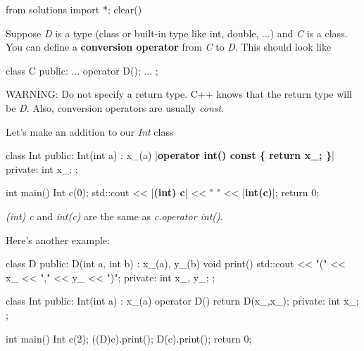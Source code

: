 \begin{python0}
from solutions import *; clear()
\end{python0}

Suppose \textit{D} is a type (class or built-in type like int, double,
...) and \textit{C} is a class. You can define a \textbf{conversion
operator} from \textit{C} to \textit{D}. This should look like

\begin{consolethree}[escapeinside=||]
class C
{
public:
    ...
    operator D();
    ...
};
\end{consolethree}

WARNING: Do not specify a return type. C++ knows that the return type
will be \textit{D}. Also, conversion operators are usually \textit{const}.

Let's make an addition to our \textit{Int} class

\begin{consolethree}[escapeinside=||]
class Int {
public:
    Int(int a)
        : x_(a)
    {}
    |{\bf operator int() const \{ return x\_; \}}|
private:
    int x_;
};
\end{consolethree}

\begin{consolethree}[escapeinside=||]
int main()
{
    Int c(0);
    std::cout << |{\bf (int) c}| << " " << |{\bf int(c)}|;
    return 0;
}
\end{consolethree}

\textit{(int) c} and \textit{int(c)} are the same as \textit{c.operator
int()}.

Here's another example:

\begin{consolethree}[escapeinside=||]
class D
{
public:
    D(int a, int b)
        : x_(a), y_(b)
    {}
    void print()
    {
        std::cout << "(" << x_ << "," << y_ << ")\n";
    }
private:
    int x_, y_;
};
\end{consolethree}

\begin{consolethree}[escapeinside=||]
class Int
{
public:
    Int(int a)
        : x_(a)
    {}
    operator D() { return D(x_,x_); }
private:
    int x_;
};
\end{consolethree}

\begin{consolethree}[escapeinside=||]
int main()
{
    Int c(2);
    ((D)c).print();
    D(c).print();
    return 0;
}
\end{consolethree}


